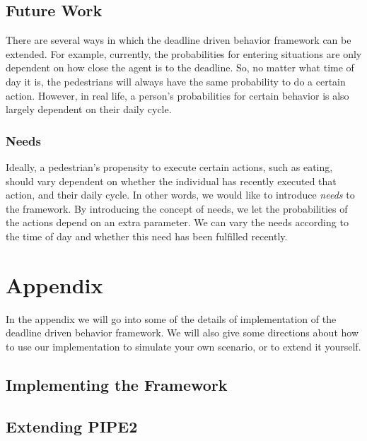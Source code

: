 \documentclass[11pt]{article}
\begin{document}
\subsection{Future Work}
There are several ways in which the deadline driven behavior framework can be extended. For example, currently, the probabilities for entering situations are only dependent on how close the agent is to the deadline. So, no matter what time of day it is, the pedestrians will always have the same probability to do a certain action. However, in real life, a person's probabilities for certain behavior is also largely dependent on their daily cycle. 

\subsubsection{Needs}
Ideally, a pedestrian's propensity to execute certain actions, such as eating, should vary dependent on whether the individual has recently executed that action, and their daily cycle. In other words, we would like to introduce \emph{needs} to the framework. By introducing the concept of needs, we let the probabilities of the actions depend on an extra parameter.  We can vary the needs according to the time of day and whether this need has been fulfilled recently.

\appendix

\section{Appendix}
In the appendix we will go into some of the details of implementation of the deadline driven behavior framework. We will also give some directions about how to use our implementation to simulate your own scenario, or to extend it yourself.


\subsection{Implementing the Framework}


\subsection{Extending PIPE2}
\end{document}
